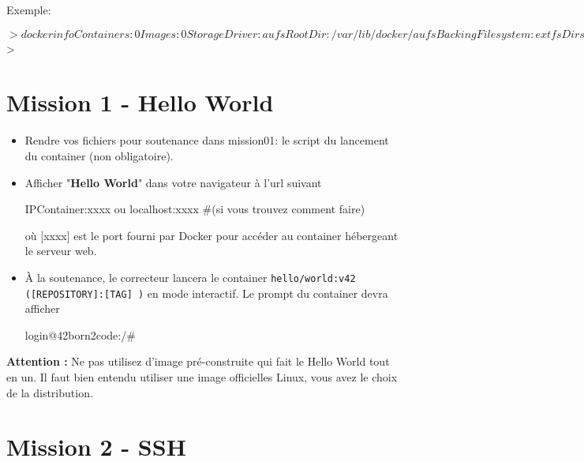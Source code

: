 \documentclass{42}
\begin{document}
Exemple:
\begin{42console}
$> docker info
Containers: 0
Images: 0
Storage Driver: aufs
 Root Dir: /var/lib/docker/aufs
 Backing Filesystem: extfs
 Dirs: 0
Execution Driver: native-0.2
Kernel Version: 3.16.0-30-generic
Operating System: Ubuntu 14.10
CPUs: 2
Total Memory: 3.633 GiB
Name: ubuntu
ID: PDDP:L64U:RQBT:G5ET:TEAC:XIJK:7JMR:ZVJW:NWU3:JMMD:YV36:WRUM
WARNING: No swap limit support
$>
\end{42console}

	\newpage

\section{Mission 1 - Hello World}

\begin{itemize}
	\item Rendre vos fichiers pour soutenance dans mission01: le script du lancement du container (non obligatoire).
	\item Afficher "\textbf{Hello World}" dans votre navigateur à l’url suivant
	\begin{42console}
		IPContainer:xxxx ou localhost:xxxx #(si vous trouvez comment faire)
	\end{42console}
	où [xxxx] est le port fourni par Docker pour accéder au container hébergeant le serveur web.
	\item À la soutenance, le correcteur lancera le container \texttt{hello/world:v42 ([REPOSITORY]:[TAG] )} en mode interactif. Le prompt du container devra afficher
	\begin{42console}
		login@42born2code:/#
	\end{42console}
\end{itemize}
\warn
{
	\textbf{Attention :} Ne pas utilisez d'image pré-construite qui fait le Hello World tout en un. Il faut bien entendu utiliser une image officielles Linux, vous avez le choix de la distribution. 
}

	\newpage

\section{Mission 2 - SSH}
\end{document}
